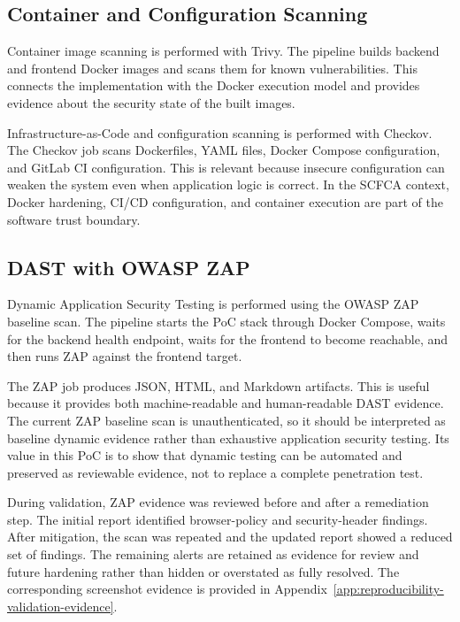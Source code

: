 \documentclass[12pt,a4paper]{report}
\begin{document}
\subsection{Container and Configuration Scanning}

Container image scanning is performed with Trivy. The pipeline builds backend and frontend Docker images and scans them for known vulnerabilities. This connects the implementation with the Docker execution model and provides evidence about the security state of the built images.

Infrastructure-as-Code and configuration scanning is performed with Checkov. The Checkov job scans Dockerfiles, YAML files, Docker Compose configuration, and GitLab CI configuration. This is relevant because insecure configuration can weaken the system even when application logic is correct. In the SCFCA context, Docker hardening, CI/CD configuration, and container execution are part of the software trust boundary.

\subsection{DAST with OWASP ZAP}

Dynamic Application Security Testing is performed using the OWASP ZAP baseline scan. The pipeline starts the PoC stack through Docker Compose, waits for the backend health endpoint, waits for the frontend to become reachable, and then runs ZAP against the frontend target.

The ZAP job produces JSON, HTML, and Markdown artifacts. This is useful because it provides both machine-readable and human-readable DAST evidence. The current ZAP baseline scan is unauthenticated, so it should be interpreted as baseline dynamic evidence rather than exhaustive application security testing. Its value in this PoC is to show that dynamic testing can be automated and preserved as reviewable evidence, not to replace a complete penetration test.

During validation, ZAP evidence was reviewed before and after a remediation step. The initial report identified browser-policy and security-header findings. After mitigation, the scan was repeated and the updated report showed a reduced set of findings. The remaining alerts are retained as evidence for review and future hardening rather than hidden or overstated as fully resolved. The corresponding screenshot evidence is provided in Appendix~\ref{app:reproducibility-validation-evidence}.
\end{document}
